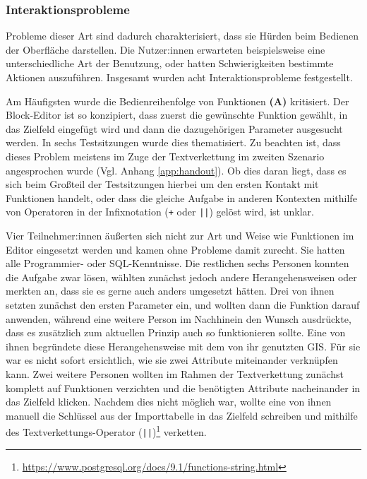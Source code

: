 \subsubsection{Interaktionsprobleme}

Probleme dieser Art sind dadurch charakterisiert, dass sie Hürden beim Bedienen der Oberfläche darstellen. Die Nutzer:innen erwarteten beispielsweise eine unterschiedliche Art der Benutzung, oder hatten Schwierigkeiten bestimmte Aktionen auszuführen. Insgesamt wurden acht Interaktionsprobleme festgestellt.

\pskip
Am Häufigsten wurde die Bedienreihenfolge von Funktionen \textbf{(A)} kritisiert. Der Block-Editor ist so konzipiert, dass zuerst die gewünschte Funktion gewählt, in das Zielfeld eingefügt wird und dann die dazugehörigen Parameter ausgesucht werden. In sechs Testsitzungen wurde dies thematisiert. Zu beachten ist, dass dieses Problem meistens im Zuge der Textverkettung im zweiten Szenario angesprochen wurde (Vgl. Anhang \ref{app:handout}). Ob dies daran liegt, dass es sich beim Großteil der Testsitzungen hierbei um den ersten Kontakt mit Funktionen handelt, oder dass die gleiche Aufgabe in anderen Kontexten mithilfe von Operatoren in der Infixnotation (\texttt{+} oder \texttt{||}) gelöst wird, ist unklar.

Vier Teilnehmer:innen äußerten sich nicht zur Art und Weise wie Funktionen im Editor eingesetzt werden und kamen ohne Probleme damit zurecht. Sie hatten alle Programmier- oder \ac{SQL}-Kenntnisse. Die restlichen sechs Personen konnten die Aufgabe zwar lösen, wählten zunächst jedoch andere Herangehensweisen oder merkten an, dass sie es gerne auch anders umgesetzt hätten. Drei von ihnen setzten zunächst den ersten Parameter ein, und wollten dann die Funktion darauf anwenden, während eine weitere Person im Nachhinein den Wunsch ausdrückte, dass es zusätzlich zum aktuellen Prinzip auch so funktionieren sollte. Eine von ihnen begründete diese Herangehensweise mit dem von ihr genutzten \ac{GIS}. Für sie war es nicht sofort ersichtlich, wie sie zwei Attribute miteinander verknüpfen kann. Zwei weitere Personen wollten im Rahmen der Textverkettung zunächst komplett auf Funktionen verzichten und die benötigten Attribute nacheinander in das Zielfeld klicken. Nachdem dies nicht möglich war, wollte eine von ihnen manuell die Schlüssel aus der Importtabelle in das Zielfeld schreiben und mithilfe des Textverkettungs-Operator (\texttt{||})\footnote{\url{https://www.postgresql.org/docs/9.1/functions-string.html}} verketten.

